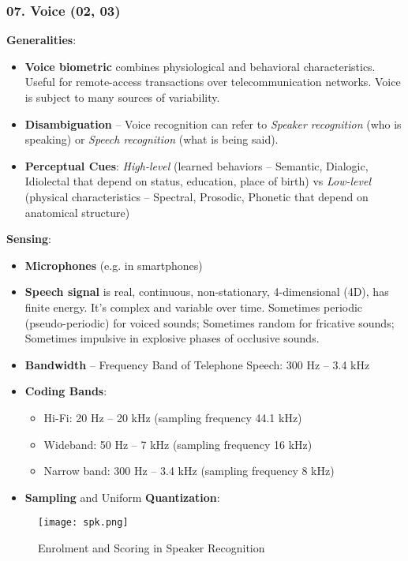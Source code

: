 \documentclass[a4paper]{article}
\begin{document}
    \subsubsection*{07. Voice (02, 03)}
      \textbf{Generalities}:
      \begin{itemize}
        \item \textbf{Voice biometric} combines physiological and behavioral characteristics. Useful for remote-access transactions over telecommunication networks. Voice is subject to many sources of variability.
        \item \textbf{Disambiguation} -- Voice recognition can refer to \emph{Speaker recognition} (who is speaking) or \emph{Speech recognition} (what is being said).
        \item \textbf{Perceptual Cues}: \emph{High-level} (learned behaviors -- Semantic, Dialogic, Idiolectal that depend on status, education, place of birth) vs \emph{Low-level} (physical characteristics -- Spectral, Prosodic, Phonetic that depend on anatomical structure)
      \end{itemize}

      \textbf{Sensing}:
      \begin{itemize}
        \item \textbf{Microphones} (e.g. in smartphones)
        \item \textbf{Speech signal} is real, continuous, non-stationary, 4-dimensional (4D), has finite energy. It's complex and variable over time. Sometimes periodic (pseudo-periodic) for voiced sounds; Sometimes random for fricative sounds; Sometimes impulsive in explosive phases of occlusive sounds.
        \item \textbf{Bandwidth} -- Frequency Band of Telephone Speech: 300 Hz -- 3.4 kHz
        \item \textbf{Coding Bands}:
        \begin{itemize}
          \item Hi-Fi: 20 Hz -- 20 kHz (sampling frequency 44.1 kHz)
          \item Wideband: 50 Hz -- 7 kHz (sampling frequency 16 kHz)
          \item Narrow band: 300 Hz -- 3.4 kHz (sampling frequency 8 kHz)
        \end{itemize}
        \item \textbf{Sampling} and Uniform \textbf{Quantization}: \todo[inline]{}
      \end{itemize}

      \begin{figure}[htp]
        \centering
          \texttt{[image: spk.png]}
          \caption{Enrolment and Scoring in Speaker Recognition}
          \label{fig:spk}
      \end{figure}
\end{document}
